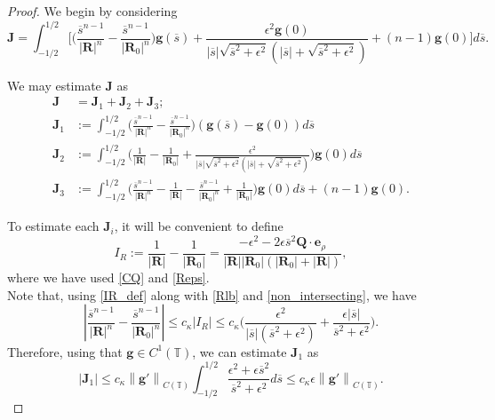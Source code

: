 \documentclass[11pt]{article}
\numberwithin{equation}{section}
\newcommand{\T}{\mathbb{T}}
\newcommand{\bars}{\overline s}
\newcommand{\be}{\bm{e}}
\newcommand{\abs}[1]{\left\lvert #1 \right\rvert}
\newcommand{\norm}[1]{\left\lVert #1 \right\rVert}
\theoremstyle{definition}
\begin{document}
\begin{proof}
We begin by considering 
\begin{equation}\label{bmJ}
\bm{J} = \int_{-1/2}^{1/2} \bigg[\bigg(\frac{\bars^{n-1}}{\abs{\bm{R}}^n} - \frac{\bars^{n-1}}{\abs{\bm{R}_0}^n} \bigg) \bm{g}(\bars)+ \frac{\epsilon^2 \bm{g}(0)}{\abs{\bars}\sqrt{\bars^2+\epsilon^2} (\abs{\bars}+\sqrt{\bars^2+\epsilon^2})} + (n-1)\bm{g}(0)\bigg]d\bars.
\end{equation}

We may estimate $\bm{J}$ as 
\begin{align*}
\bm{J} &= \bm{J}_1 + \bm{J}_2+\bm{J}_3; \\
\bm{J}_1 &:= \int_{-1/2}^{1/2} \bigg(\frac{\bars^{n-1}}{\abs{\bm{R}}^n} - \frac{\bars^{n-1}}{\abs{\bm{R}_0}^n} \bigg) (\bm{g}(\bars)-\bm{g}(0))d\bars \\
\bm{J}_2 &:= \int_{-1/2}^{1/2} \bigg(\frac{1}{\abs{\bm{R}}} - \frac{1}{\abs{\bm{R}_0}} +\frac{\epsilon^2}{\abs{\bars}\sqrt{\bars^2+\epsilon^2} (\abs{\bars}+\sqrt{\bars^2+\epsilon^2})}  \bigg) \bm{g}(0) d\bars \\
\bm{J}_3 &:= \int_{-1/2}^{1/2} \bigg(\frac{\bars^{n-1}}{\abs{\bm{R}}^n} -\frac{1}{\abs{\bm{R}}} - \frac{\bars^{n-1}}{\abs{\bm{R}_0}^n} +\frac{1}{\abs{\bm{R}_0}} \bigg) \bm{g}(0) d\bars + (n-1) \bm{g}(0). 
\end{align*}

To estimate each $\bm{J}_i$, it will be convenient to define 
\begin{equation}\label{IR_def}
I_R := \frac{1}{\abs{\bm{R}}} - \frac{1}{\abs{\bm{R}_0}} = \frac{-\epsilon^2 - 2\epsilon\bars^2\bm{Q}\cdot\be_\rho}{\abs{\bm{R}}\abs{\bm{R}_0}(\abs{\bm{R}_0}+\abs{\bm{R}})},
\end{equation}
where we have used \eqref{CQ} and \eqref{Reps}. \\

Note that, using \eqref{IR_def} along with \eqref{Rlb} and \eqref{non_intersecting}, we have
\[ \abs{\frac{\bars^{n-1}}{\abs{\bm{R}}^n} - \frac{\bars^{n-1}}{\abs{\bm{R}_0}^n}} \le c_\kappa\abs{I_R}  \le c_\kappa\bigg( \frac{\epsilon^2}{\abs{\bars}(\bars^2+\epsilon^2)} + \frac{\epsilon \abs{\bars}}{\bars^2+\epsilon^2}\bigg). \]
Therefore, using that $\bm{g}\in C^1(\T)$, we can estimate $\bm{J}_1$ as 
\[ \abs{\bm{J}_1} \le c_\kappa \norm{\bm{g}'}_{C(\T)} \int_{-1/2}^{1/2} \frac{\epsilon^2+\epsilon\bars^2}{\bars^2+\epsilon^2} d\bars \le c_\kappa \epsilon \norm{\bm{g}'}_{C(\T)}.  \]


\end{proof}
\end{document}
